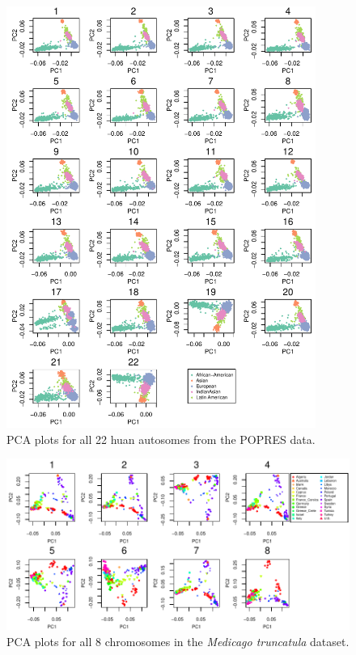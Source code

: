 \documentclass[11pt, oneside]{article}   	%
\begin{document}
\begin{figure}
    \begin{center}
       \includegraphics[width=0.9\textwidth]{FigS_pca_plot_allchr_human}
    \end{center}
    \caption{
        PCA plots for all 22 huan autosomes from the POPRES data.
        \label{sfig:pca_human_allchr}
    }
\end{figure}

\begin{figure}
    \begin{center}
       \includegraphics[width=1\textwidth]{FigS_pca_plots_medicago_allchr}
    \end{center}
    \caption{
        PCA plots for all 8 chromosomes in the \textit{Medicago truncatula} dataset.
        \label{sfig:pca_medicago_allchr}
    }
\end{figure}
\end{document}
